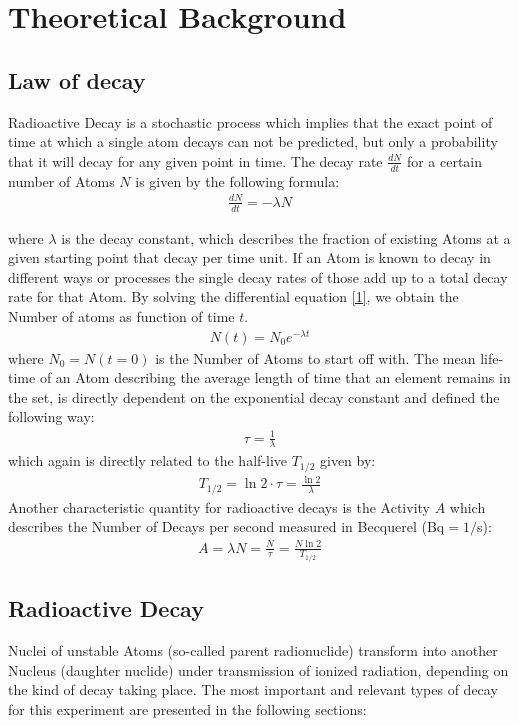 \documentclass[12pt]{article}
\begin{document}
\newpage
\section{Theoretical Background}

\subsection{Law of decay}\label{zerfallsgesetz}

Radioactive Decay is a stochastic process which implies that the exact point of time at which a single atom decays can not be predicted, but only a probability that it will decay for any given point in time.  
The decay rate $\frac{dN}{dt}$ for a certain number of Atoms $N$ is given by the following formula:
\begin{align}
\frac{dN}{dt}=-\lambda N \label{1}
\end{align}

where $\lambda$ is the decay constant, which describes the fraction of existing Atoms at a given starting point that decay per time unit.
If an Atom is known to decay in different ways or processes the single decay rates of those add up to a total decay rate for that Atom.
By solving the differential equation \ref{1}, we obtain the Number of atoms as function of time $t$.
\begin{align}
N(t)=N_0e^{-\lambda t}
\end{align}
where $N_0=N(t=0)$ is the Number of Atoms to start off with.
The mean life-time of an Atom describing the average length of time that an element remains in the set, is directly dependent on the exponential decay constant and defined the following way:
\begin{align}
\tau=\frac{1}{\lambda}
\end{align}
which again is directly related to the half-live $T_{1/2}$ given by:
\begin{align}
T_{1/2} = \ln2\cdot \tau = \frac{\ln2}{\lambda}
\end{align}
Another characteristic quantity for radioactive decays is the Activity $A$ which describes the Number of Decays per second measured in Becquerel (Bq$=1/$s):
\begin{align}
A = \lambda N = \frac{N}{\tau} = \frac{N\ln2}{T_{1/2}}\label{activity}
\end{align}

\subsection{Radioactive Decay}
Nuclei of unstable Atoms (so-called parent radionuclide) transform into another Nucleus (daughter nuclide) under transmission of ionized radiation, depending on the kind of decay taking place. The most important and relevant types of decay for this experiment are presented in the following sections:
\end{document}
